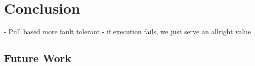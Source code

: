 \chapter{Conclusion}
\label{chapter:conclusion}

- Pull based more fault tolerant - if execution fails, we just serve an allright value

\section{Future Work}
\label{sec:future_work}






